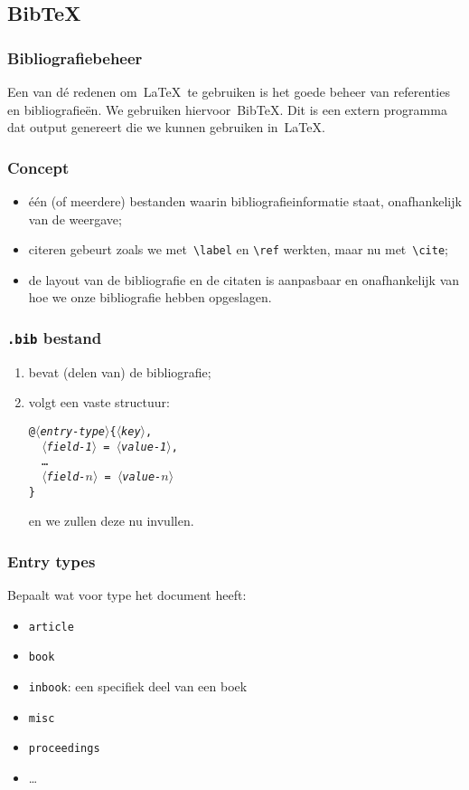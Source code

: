 \subsection{Bib\TeX}
\begin{frame}
  \frametitle{Bibliografiebeheer}

  Een van d\'e redenen om~\LaTeX\ te gebruiken is het goede beheer van referenties en bibliografie\"en. We gebruiken hiervoor~Bib\TeX. Dit is een extern programma dat output genereert die we kunnen gebruiken in~\LaTeX.
\end{frame}

\begin{frame}
  \frametitle{Concept}

  \begin{itemize}
	\item \'e\'en (of meerdere) bestanden waarin bibliografie\-informatie staat, onafhankelijk van de weergave;
    \item citeren gebeurt zoals we met~\texttt{\textbackslash label} en \texttt{\textbackslash ref} werkten, maar nu met~\texttt{\textbackslash cite};
	\item de layout van de bibliografie en de citaten is aanpasbaar en onafhankelijk van hoe we onze bibliografie hebben opgeslagen.
  \end{itemize}
\end{frame}

\begin{frame}
  \frametitle{\texttt{.bib} bestand}

  \begin{enumerate}
	\item bevat (delen van) de bibliografie;
	\item volgt een vaste structuur:

	  \texttt{@\textsl{$\langle$entry-type$\rangle$}\{\textsl{$\langle$key$\rangle$},\\
	  \ \ \textsl{$\langle$field-1$\rangle$} = \textsl{$\langle$value-1$\rangle$}, \\
	  \ \ \ldots \\
	  \ \ \textsl{$\langle$field-$n\rangle$} = \textsl{$\langle$value-$n\rangle$} \\
	  \}}
	  
	  en we zullen deze nu invullen.
  \end{enumerate}
\end{frame}

\begin{frame}
  \frametitle{Entry types}

  Bepaalt wat voor type het document heeft:
  \begin{itemize}
	\item \texttt{article}
	\item \texttt{book}
	\item \texttt{inbook}: een specifiek deel van een boek
	\item \texttt{misc}
	\item \texttt{proceedings}
	\item \ldots
  \end{itemize}
\end{frame}


